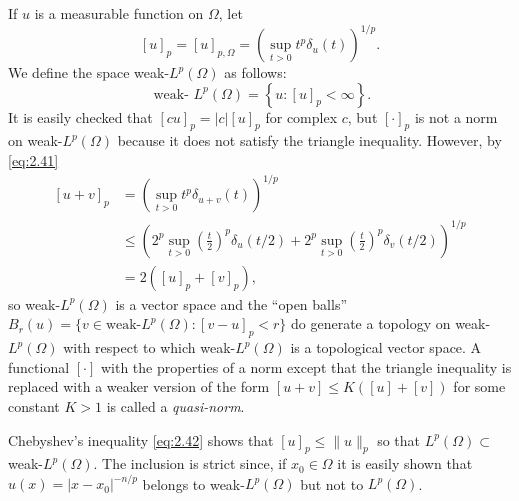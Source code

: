 \begin{para}
  If $u$ is a measurable function on $\Omega$, let
  \[ [u]_p = [u]_{p,\Omega} = \left(\sup_{t>0} t^p \delta_u(t)\right)^{1/p}. \]
  We define the space weak-$L^p(\Omega)$ as follows:
  \[ \text { weak- } L^p(\Omega)=\left\{u:[u]_p<\infty\right\}. \]
  It is easily checked that $[c u]_p=|c|[u]_p$ for complex $c$,
  but $[\cdot]_p$ is not a norm on weak-$L^p(\Omega)$ because it does not satisfy the triangle inequality. 
  However, by \eqref{eq:2.41}
  \begin{align*}
    {[u+v]_p } 
    & =\left(\sup _{t>0} t^p \delta_{u+v}(t)\right)^{1 / p} \\
    & \leq\left(2^p \sup _{t>0}\left(\frac{t}{2}\right)^p \delta_u(t / 2)+2^p
      \sup_{t>0}\left(\frac{t}{2}\right)^p \delta_v(t / 2)\right)^{1 / p} \\
    & =2\left([u]_p+[v]_p\right),
  \end{align*}
  so weak-$L^p(\Omega)$ is a vector space and the ``open balls''
  $B_r(u) = \{v\in\text{weak-}L^p(\Omega) : [v-u]_p<r\}$
  do generate a topology on weak-$L^p(\Omega)$ with respect to which weak-$L^p(\Omega)$
  is a topological vector space.
  A functional $[\cdot]$ with the properties of a norm except that the triangle inequality
  is replaced with a weaker version of the form $[u+v] \leq K([u]+[v])$
  for some constant $K>1$ is called a \emph{quasi-norm}.

  Chebyshev's inequality \eqref{eq:2.42} shows that $[u]_p \leq\|u\|_p$
  so that $L^p(\Omega) \subset$ weak-$L^p(\Omega)$.
  The inclusion is strict since, if $x_0 \in \Omega$ it is easily shown
  that $u(x)=\left|x-x_0\right|^{-n / p}$ belongs to weak-$L^p(\Omega)$ but not to $L^p(\Omega)$.
\end{para}

